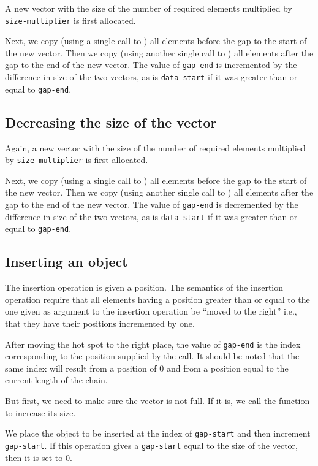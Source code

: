 \documentclass[11pt]{article}
\begin{document}
A new vector with the size of the number of required elements
multiplied by \texttt{size-multiplier} is first allocated.

Next, we copy (using a single call to ) all elements
before the gap to the start of the new vector.  Then we copy (using
another single call to ) all elements after the gap to the
end of the new vector. The value of \texttt{gap-end} is incremented by
the difference in size of the two vectors, as is \texttt{data-start}
if it was greater than or equal to \texttt{gap-end}. 

\subsection{Decreasing the size of the vector}

Again, a new vector with the size of the number of required elements
multiplied by \texttt{size-multiplier} is first allocated.

Next, we copy (using a single call to ) all elements
before the gap to the start of the new vector.  Then we copy (using
another single call to ) all elements after the gap to the
end of the new vector. The value of \texttt{gap-end} is decremented by
the difference in size of the two vectors, as is \texttt{data-start}
if it was greater than or equal to \texttt{gap-end}. 

\subsection{Inserting an object}

The insertion operation is given a position.  The semantics of the
insertion operation require that all elements having a position
greater than or equal to the one given as argument to the insertion
operation be ``moved to the right'' i.e., that they have their
positions incremented by one.

After moving the hot spot to the right place, the value of
\texttt{gap-end} is the index corresponding to the position supplied
by the call.  It should be noted that the same index will result from
a position of $0$ and from a position equal to the current length of
the chain.

But first, we need to make sure the vector is not full.  If it is, we
call the function to increase its size. 

We place the object to be inserted at the index of \texttt{gap-start}
and then increment \texttt{gap-start}.  If this operation gives a
\texttt{gap-start} equal to the size of the vector, then it is set to
$0$.
\end{document}
